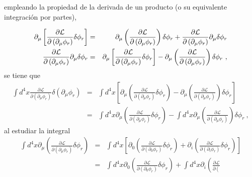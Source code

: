 \begin{solution}
empleando la propiedad de la derivada de un producto (o su equivalente integraci\'{o}n por partes),

\begin{eqnarray}
\partial _{\mu }\left[ \frac{\partial \mathcal{L}}{\partial \left( \partial
_{\mu }\phi _{r}\right) }\delta \phi _{r}\right]  &=&\partial _{\mu }\left( 
\frac{\partial \mathcal{L}}{\partial \left( \partial _{\mu }\phi _{r}\right) 
}\right) \delta \phi _{r}+\frac{\partial \mathcal{L}}{\partial \left(
\partial _{\mu }\phi _{r}\right) }\partial _{\mu }\delta \phi _{r}  \notag \\
\frac{\partial \mathcal{L}}{\partial \left( \partial _{\mu }\phi _{r}\right) 
}\partial _{\mu }\delta \phi _{r} &=&\partial _{\mu }\left[ \frac{\partial 
\mathcal{L}}{\partial \left( \partial _{\mu }\phi _{r}\right) }\delta \phi
_{r}\right] -\partial _{\mu }\left( \frac{\partial \mathcal{L}}{\partial
\left( \partial _{\mu }\phi _{r}\right) }\right) \delta \phi _{r}~,
\end{eqnarray}%
se tiene que%
\begin{eqnarray*}
\int d^{4}x\frac{\partial \mathcal{L}}{\partial \left( \partial _{\mu }\phi
_{r}\right) }\delta \left( \partial _{\mu }\phi _{r}\right)  &=&\int d^{4}x%
\left[ \partial _{\mu }\left( \frac{\partial \mathcal{L}}{\partial \left(
\partial _{\mu }\phi _{r}\right) }\delta \phi _{r}\right) -\partial _{\mu
}\left( \frac{\partial \mathcal{L}}{\partial \left( \partial _{\mu }\phi
_{r}\right) }\right) \delta \phi _{r}\right]  \\
&=&\int d^{4}x\partial _{\mu }\left( \frac{\partial \mathcal{L}}{\partial
\left( \partial _{\mu }\phi _{r}\right) }\delta \phi _{r}\right) -\int
d^{4}x\partial _{\mu }\left( \frac{\partial \mathcal{L}}{\partial \left(
\partial _{\mu }\phi _{r}\right) }\right) \delta \phi _{r}~,
\end{eqnarray*}%
al estudiar la integral%
\begin{eqnarray*}
\int d^{4}x\partial _{\mu }\left( \frac{\partial \mathcal{L}}{\partial
\left( \partial _{\mu }\phi _{r}\right) }\delta \phi _{r}\right)  &=&\int
d^{4}x\left[ \partial _{0}\left( \frac{\partial \mathcal{L}}{\partial \left(
\partial _{0}\phi _{r}\right) }\delta \phi _{r}\right) +\partial _{i}\left( 
\frac{\partial \mathcal{L}}{\partial \left( \partial _{i}\phi _{r}\right) }%
\delta \phi _{r}\right) \right]  \\
&=&\int d^{4}x\partial _{0}\left( \frac{\partial \mathcal{L}}{\partial
\left( \partial _{0}\phi _{r}\right) }\delta \phi _{r}\right) +\int
d^{4}x\partial _{i}\left( \frac{\partial \mathcal{L}}{\partial \left(
}
\end{eqnarray*}
\end{solution}
